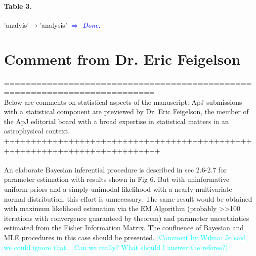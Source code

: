 \documentclass[10pt,a4paper]{article}
\newcommand{\HW}[1]{\textcolor{Cyan}{#1}}
\newcommand{\Comment}[1]{\textsl{\textcolor{Blue}{$\Longrightarrow$ {#1}}}}
\begin{document}
\paragraph{Table 3.} 'analyis'$\rightarrow$'analysis'  \Comment{Done.}

\section{Comment from Dr. Eric Feigelson}


==========================================================================\\
Below are comments on statistical aspects of the manuscript: ApJ submissions with a
statistical component are previewed by Dr. Eric Feigelson, the member of the ApJ
editorial board with a broad expertise in statistical matters in an astrophysical
context.\\
+++++++++++++++++++++++++++++++++++++++++++++++++++++++++++++++++++++++++++\\\\

An elaborate Bayesian inferential procedure is described in sec 2.6-2.7 for
parameter estimation with results shown in Fig 6. But with uninformative uniform
priors and a simply unimodal likelihood with a nearly multivariate normal
distribution, this effort is unnecessary. The same result would be obtained with
maximum likelihood estimation via the EM Algorithm (probably >>100 iterations with
convergence guaranteed by theorem) and parameter uncertainties estimated from the
Fisher Information Matrix. The confluence of Bayesian and MLE procedures in this
case should be presented. \HW{[Comment by Wilma: Jo said, we could ignore that... Can we really? What should I answer the referee?]}
\end{document}
